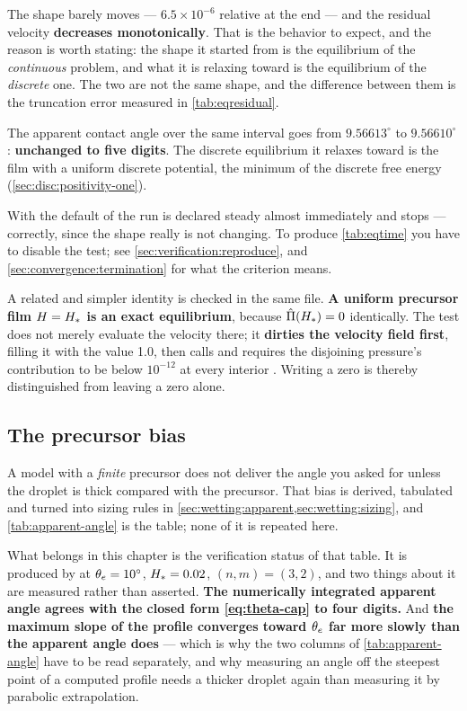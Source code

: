 The shape barely moves --- $6.5\times10^{-6}$ relative at the end --- and the
residual velocity \textbf{decreases monotonically}. That is the behavior to
expect, and the reason is worth stating: the shape it started from is the
equilibrium of the \emph{continuous} problem, and what it is relaxing toward
is the equilibrium of the \emph{discrete} one. The two are not the same shape,
and the difference between them is the truncation error measured in
\cref{tab:eqresidual}.

The apparent contact angle over the same interval goes from $9.56613^\circ$ to
$9.56610^\circ$: \textbf{unchanged to five digits}. The discrete equilibrium
it relaxes toward is the film with a uniform discrete potential, the minimum of
the discrete free energy (\cref{sec:disc:positivity-one}).

\begin{note}
  With the default  of  the run is declared
  steady almost immediately and stops --- correctly, since the shape really is
  not changing. To produce \cref{tab:eqtime} you have to disable the test; see
  \cref{sec:verification:reproduce}, and \cref{sec:convergence:termination} for
  what the criterion means.
\end{note}

A related and simpler identity is checked in the same file. \textbf{A uniform
precursor film $H = H_{*}$ is an exact equilibrium}, because
$\hat{\Pi}(H_{*}) = 0$ identically. The test does not merely evaluate the
velocity there; it \textbf{dirties the velocity field first}, filling it with
the value 1.0, then calls  and requires the disjoining
pressure's contribution to be below $10^{-12}$ at every interior .
Writing a zero is thereby distinguished from leaving a zero alone.

\subsection{The precursor bias}

A model with a \emph{finite} precursor does not deliver the angle you asked for
unless the droplet is thick compared with the precursor. That bias is derived,
tabulated and turned into sizing rules in
\cref{sec:wetting:apparent,sec:wetting:sizing}, and \cref{tab:apparent-angle}
is the table; none of it is repeated here.

What belongs in this chapter is the verification status of that table. It is
produced by  at
$\theta_{e} = 10^\circ$, $H_{*} = 0.02$, $(n,m) = (3,2)$, and two things about it
are measured rather than asserted. \textbf{The numerically integrated apparent
angle agrees with the closed form \cref{eq:theta-cap} to four digits.} And
\textbf{the maximum slope of the profile converges toward $\theta_{e}$ far more
slowly than the apparent angle does} --- which is why the two columns of
\cref{tab:apparent-angle} have to be read separately, and why measuring an
angle off the steepest point of a computed profile needs a thicker droplet
again than measuring it by parabolic extrapolation.

